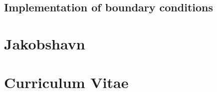 \documentclass[a4paper,twoside,11pt,pdftex]{report}
\begin{document}
\section{Implementation of boundary conditions}\label{sec:slip}


\cleardoublepage
% 

% 

\chapter{Jakobshavn}

\cleardoublepage



\cleardoublepage

\appendix

\pagestyle{plain}
\chapter*{Curriculum Vitae}
\end{document}
